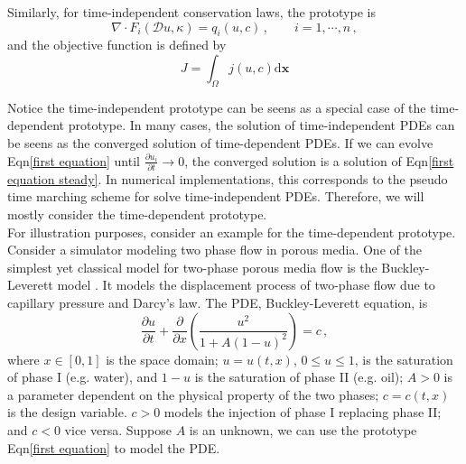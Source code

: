 \documentclass[a4paper,onecolumn]{article}
\theoremstyle{remark}
\begin{document}
\noindent Similarly, for time-independent conservation laws, the prototype is
\begin{equation}
    \nabla \cdot 
    F_i(\mathcal{D} u, \kappa) 
    = q_i(u,c)\,, \qquad i=1,\cdots, n\,,
    \label{first equation steady}
\end{equation}
and the objective function is defined by
\begin{equation}
    J = \int_\Omega j(u,c) \textrm{d}\mathbf{x}
\end{equation}

\noindent Notice the time-independent prototype can be seens as a special case 
of the time-dependent prototype. In many cases, the solution of time-independent PDEs
can be seens as the converged solution of time-dependent PDEs. If we can evolve 
Eqn\eqref{first equation} until $\frac{\partial u_i}{\partial t}\rightarrow 0$,
the converged solution is a solution of Eqn\eqref{first equation steady}.
In numerical implementations, this corresponds to the pseudo time marching scheme
for solve time-independent PDEs. Therefore, we will mostly consider the time-dependent 
prototype.\\

\noindent For illustration purposes, 
consider an example for the time-dependent prototype. Consider 
a simulator modeling two phase flow in porous media.
One of the simplest yet classical model for two-phase porous media flow is the Buckley-Leverett model \cite{Buckley Leverett, Reservoir Simulation Book}. 
It models the displacement process of two-phase flow due to capillary pressure and Darcy's law.
The PDE, Buckley-Leverett equation, is
\begin{equation}
    \frac{\partial u}{\partial t} + \frac{\partial}{\partial x} \left(\frac{u^2}{1+A(1-u)^2}\right) = c\,,
    \label{Buck-Lev eqn}
\end{equation}
where $x\in[0,1]$ is the space domain;
$u = u(t,x)$, $0\le u\le 1$, is the saturation of phase I (e.g. water), 
and $1-u$ is the saturation of phase II (e.g. oil);
$A>0$ is a parameter dependent on the physical property of the two phases;
$c=c(t,x)$ is the design variable. $c>0$ models the injection of phase I replacing phase II; and $c<0$ vice versa.
Suppose $A$ is an unknown, we can use the prototype Eqn\eqref{first equation} to 
model the PDE.\\
\end{document}
